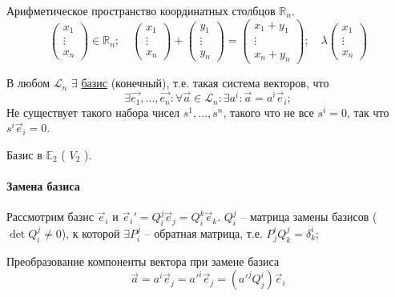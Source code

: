 \begin{example}
  Арифметическое пространство координатных столбцов $\mathbb{R}_n$.
  \[
    \begin{pmatrix}
      x_1 \\
      \vdots \\
      x_n
    \end{pmatrix} \in \mathbb{R}_n; \quad
    \begin{pmatrix}
      x_1 \\
      \vdots \\
      x_n
    \end{pmatrix} + \begin{pmatrix}
      y_1 \\
      \vdots \\
      y_n
    \end{pmatrix} = 
    \begin{pmatrix}
      x_1 + y_1 \\
      \vdots \\
      x_n + y_n
    \end{pmatrix}; \quad
    \lambda \begin{pmatrix}
      x_1 \\
      \vdots \\
      x_n
    \end{pmatrix} 
  \]
\end{example}

В любом $\mathcal{L}_n$ $\exists$ \underline{базис} (конечный), т.е. такая система векторов, что
\[
  \exists \vec{e_1}, \dots, \vec{e_n}: \forall \vec{a} \in \mathcal L_n: \exists a^i :  \vec{a} = a^i \vec{e}_i;
\]
Не существует такого набора чисел $s^1, \dots, s^n$, такого что не все $s^i = 0$, так что
$s^i \vec{e}_i = 0$.

\begin{example}
  Базис в $\mathbb E_2$ ( $V_2$ ). 
\end{example}

\paragraph{Замена базиса}

Рассмотрим базис $\vec{e}_i$ и $\vec{e}_i' = Q_i^j \vec{e}_j = Q^k_i \vec{e}_k$. $Q^j_i$ -- матрица 
замены базисов ($\det Q^j_i \neq 0$), к которой $\exists P^j_i$ -- обратная матрица, т.е. $P^i_j Q^j_k = \delta^i_k$; 

Преобразование компоненты вектора при замене базиса
\[
  \vec{a} = a^i \vec{e}_j = {a'}^i \vec{e}_j = ({a'}^j Q^i_j) \vec{e}_i
\]

